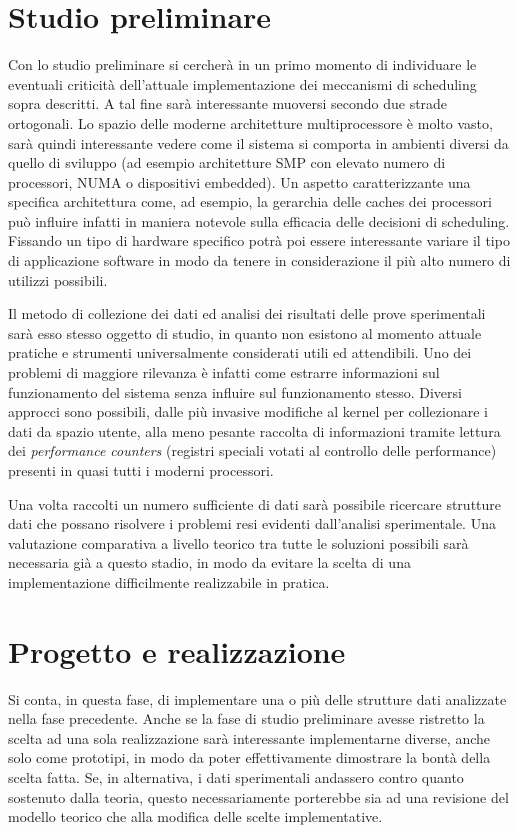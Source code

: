 \documentclass[a4paper, 11pt, oneside]{article}
\begin{document}
\section*{Studio preliminare}
Con lo studio preliminare si cercherà in un primo momento di individuare le
eventuali criticità dell'attuale implementazione dei meccanismi di scheduling
sopra descritti. A tal fine sarà interessante muoversi secondo due strade
ortogonali. Lo spazio delle moderne architetture multiprocessore è molto vasto,
sarà quindi interessante vedere come il sistema si comporta in ambienti diversi
da quello di sviluppo (ad esempio architetture SMP con elevato numero di
processori, NUMA o dispositivi embedded). Un aspetto caratterizzante una
specifica architettura come, ad esempio, la gerarchia delle caches dei
processori può influire infatti in maniera notevole sulla efficacia delle
decisioni di scheduling.
Fissando un tipo di hardware specifico
potrà poi essere interessante variare il tipo di applicazione software in modo
da tenere in considerazione il più alto numero di utilizzi possibili.

Il metodo di collezione dei dati ed analisi dei risultati delle prove
sperimentali sarà esso stesso oggetto di studio, in quanto non esistono al
momento attuale pratiche e strumenti universalmente considerati utili ed
attendibili. Uno dei problemi di maggiore rilevanza è infatti come estrarre
informazioni sul funzionamento del sistema senza influire sul funzionamento
stesso. Diversi approcci sono possibili, dalle più invasive modifiche al kernel
per collezionare i dati da spazio utente, alla meno pesante raccolta di
informazioni tramite lettura dei \emph{performance counters} (registri speciali
votati al controllo delle performance) presenti in quasi tutti i moderni
processori.

Una volta raccolti un numero sufficiente di dati sarà possibile ricercare
strutture dati che possano risolvere i problemi resi evidenti dall'analisi
sperimentale. Una valutazione comparativa a livello teorico tra tutte le
soluzioni possibili sarà necessaria già a questo stadio, in modo da evitare
la scelta di una implementazione difficilmente realizzabile in pratica. 

\section*{Progetto e realizzazione}
Si conta, in questa fase, di implementare una o più delle strutture dati
analizzate nella fase precedente. Anche se la fase di studio preliminare
avesse ristretto
la scelta ad una sola realizzazione sarà interessante implementarne diverse,
anche solo come prototipi, in modo da poter effettivamente dimostrare la bontà
della scelta fatta. Se, in alternativa, i dati sperimentali andassero contro
quanto sostenuto dalla teoria, questo necessariamente porterebbe sia ad una
revisione del modello teorico che alla modifica delle scelte implementative.
\end{document}
